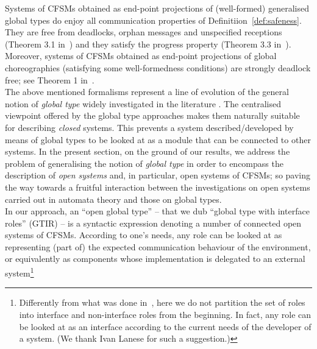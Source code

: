 \vspace{2mm}
Systems of CFSMs obtained as end-point projections of (well-formed)  generalised global types
do enjoy all communication properties of Definitiion~\ref{def:safeness}. They are free from deadlocks, orphan messages and unspecified receptions (Theorem 3.1 in~\cite{DY12}) and they satisfy the progress property
(Theorem 3.3 in~\cite{DY12}). Moreover, systems of CFSMs obtained
as end-point projections of global choreographies (satisfying some well-formedness conditions) 
are strongly deadlock free; see Theorem 1 in~\cite{TG18}.\\

The above mentioned formalisms represent a line of evolution of the general notion of {\em global type} widely investigated in
the literature  \cite{CHY07,CDP12,CDYP16}.
The centralised viewpoint offered by the global type approaches makes them naturally suitable for describing
{\em closed} systems. This prevents a system described/developed by means of global types
to be looked at as a module that can be connected to other systems.
In the present section, on the ground of our results, we address  the problem of
generalising the notion of {\em global type} in order to encompass  the description of {\em open systems}
and, in particular, open systems of CFSMs; so paving the way towards a fruitful interaction between the investigations on open systems carried out in automata theory and those on global types. \\

In our approach, an ``open global type'' -- that we dub ``global type with interface roles'' (GTIR) -- is a
syntactic expression denoting
a number of connected open systems of CFSMs.
According to one's needs, any role can be looked at
as representing (part of) the expected communication behaviour of the environment, or equivalently
as components whose implementation is delegated to an external system\footnote{Differently from what was done in~\cite{BdLH18}, here we do not partition the set of roles into interface and non-interface roles from the beginning. In fact,
 any role can be looked at as an interface according to the current needs of the developer of a system.
(We thank Ivan Lanese for such a suggestion.)}\\


